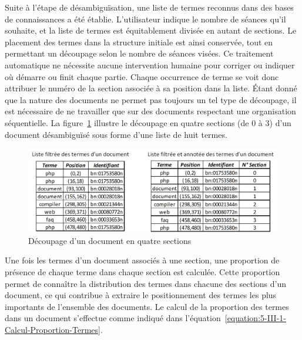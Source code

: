 \bigskip

Suite à l'étape de désambiguïsation, une liste de termes reconnus dans des bases de connaissances a été établie.
L'utilisateur indique le nombre de séances qu'il souhaite, et la liste de termes est équitablement divisée en autant de sections.
Le placement des termes dans la structure initiale est ainsi conservée, tout en permettant un découpage selon le nombre de séances visées.
Ce traitement automatique ne nécessite aucune intervention humaine pour corriger ou indiquer où démarre ou finit chaque partie.
Chaque occurrence de terme se voit donc attribuer le numéro de la section associée à sa position dans la liste.
Étant donné que la nature des documents ne permet pas toujours un tel type de découpage, il est nécessaire de ne travailler que sur des documents respectant une organisation séquentielle.
La figure~\ref{figure:5-III-1-Decoupage} illustre le découpage en quatre sections (de 0 à 3) d'un document désambiguïsé sous forme d'une liste de huit termes.


\begin{figure}[ht]
\centering
\includegraphics[scale=0.8]{5-Conclusion/images/3-analyse-temporelle/exemple_decoupage_documents.png}
\caption{Découpage d'un document en quatre sections}
\label{figure:5-III-1-Decoupage}
\end{figure}

\bigskip

Une fois les termes d'un document associés à une section, une proportion de présence de chaque terme dans chaque section est calculée.
Cette proportion permet de connaître la distribution des termes dans chacune des sections d'un document, ce qui contribue à extraire le positionnement des termes les plus importants de l'ensemble des documents.
Le calcul de la proportion des termes dans un document s'effectue comme indiqué dans l'équation~\eqref{equation:5-III-1-Calcul-Proportion-Termes}.

